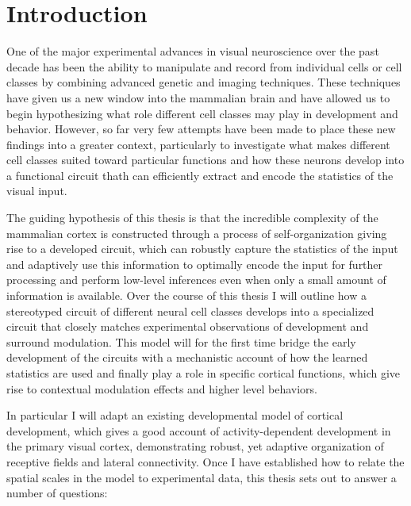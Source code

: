 \chapter{Introduction}

One of the major experimental advances in visual neuroscience over the
past decade has been the ability to manipulate and record from
individual cells or cell classes by combining advanced genetic and
imaging techniques. These techniques have given us a new window into the mammalian
brain and have allowed us to begin hypothesizing what role different
cell classes may play in development and behavior. However, so far
very few attempts have been made to place these new findings into a
greater context, particularly to investigate what makes different cell
classes suited toward particular functions and how these neurons
develop into a functional circuit thath can efficiently extract and
encode the statistics of the visual input.

The guiding hypothesis of this thesis is that the incredible
complexity of the mammalian cortex is constructed through a process of
self-organization giving rise to a developed circuit, which can
robustly capture the statistics of the input and adaptively use this
information to optimally encode the input for further processing and
perform low-level inferences even when only a small amount of information is
available. Over the course of this thesis I will outline how a 
stereotyped circuit of different neural cell classes develops into a
specialized circuit that closely matches experimental observations of development
and surround modulation. This model will for the first time bridge the early
development of the circuits with a mechanistic account of how the
learned statistics are used and finally play a role in specific
cortical functions, which give rise to contextual modulation effects
and higher level behaviors.

In particular I will adapt an existing developmental model of
cortical development, which gives a good account of
activity-dependent development in the primary visual cortex,
demonstrating robust, yet adaptive organization of receptive fields
and lateral connectivity. Once I have established how to relate the
spatial scales in the model to experimental data, this thesis sets out
to answer a number of questions:

